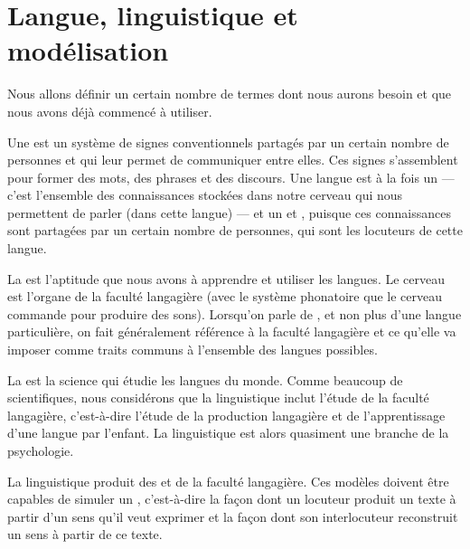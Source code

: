 \section{Langue, linguistique et modélisation}\label{sec:1.1.7}

Nous allons définir un certain nombre de termes dont nous aurons besoin et que nous avons déjà commencé à utiliser.


{Une  est un système de signes conventionnels partagés par un certain nombre de personnes et qui leur permet de communiquer entre elles. Ces signes s’assemblent pour former des mots, des phrases et des discours. Une langue est à la fois un  — c’est l’ensemble des connaissances stockées dans notre cerveau qui nous permettent de parler (dans cette langue) — et un  et , puisque ces connaissances sont partagées par un certain nombre de personnes, qui sont les locuteurs de cette langue.}

{La  est l’aptitude que nous avons à apprendre et utiliser les langues. Le cerveau est l’organe de la faculté langagière (avec le système phonatoire que le cerveau commande pour produire des sons). Lorsqu’on parle de , et non plus d’une langue particulière, on fait généralement référence à la faculté langagière et ce qu’elle va imposer comme traits communs à l’ensemble des langues possibles.}

{La  est la science qui étudie les langues du monde. Comme beaucoup de scientifiques, nous considérons que la linguistique inclut l’étude de la faculté langagière, c’est-à-dire l’étude de la production langagière et de l’apprentissage d’une langue par l’enfant. La linguistique est alors quasiment une branche de la psychologie.}

La linguistique produit des   et de la faculté langagière. Ces modèles doivent être capables de simuler un , c’est-à-dire la façon dont un locuteur produit un texte à partir d’un sens qu’il veut exprimer et la façon dont son interlocuteur reconstruit un sens à partir de ce texte.

